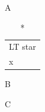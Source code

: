 \documentclass{article}
\begin{document}
\begin{table}A\caption{A}\end{table}
\begin{longtable}{l}\caption*{LT star}\\ x\\\end{longtable}
\begin{table}B\caption{B}\end{table}
\begin{table}C\caption{C}\end{table}
\end{document}
